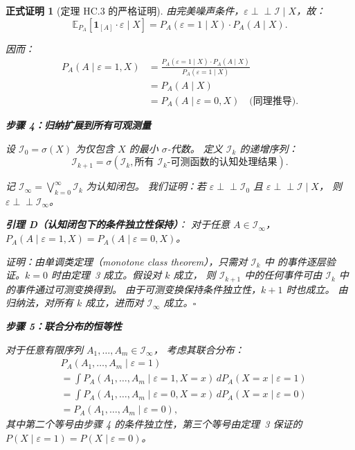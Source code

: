 \documentclass[12pt,a4paper]{article}
\newtheorem{formalproof}[theorem]{正式证明}
\newcommand{\E}{\mathbb{E}}
\newcommand{\cI}{\mathcal{I}}
\newcommand{\ind}[1]{\mathbf{1}_{[#1]}}
\begin{document}
\begin{formalproof}[定理 HC.3 的严格证明]
由完美噪声条件，$\varepsilon \perp\!\!\!\perp \cI \mid X$，故：
\begin{equation}
    \E_{P_A}[\ind{A} \cdot \varepsilon \mid X] = P_A(\varepsilon=1 \mid X) \cdot P_A(A \mid X).
\end{equation}

因而：
\begin{align}
    P_A(A \mid \varepsilon=1, X)
    &= \frac{P_A(\varepsilon=1 \mid X) \cdot P_A(A \mid X)}{P_A(\varepsilon=1 \mid X)} \\
    &= P_A(A \mid X) \\
    &= P_A(A \mid \varepsilon=0, X) \quad \text{(同理推导)}.
\end{align}

\textbf{步骤 4：归纳扩展到所有可观测量}

设 $\cI_0 = \sigma(X)$ 为仅包含 $X$ 的最小 $\sigma$-代数。
定义 $\cI_k$ 的递增序列：
\begin{equation}
    \cI_{k+1} = \sigma(\cI_k, \text{所有 $\cI_k$-可测函数的认知处理结果}).
\end{equation}

记 $\cI_{\infty} = \bigvee_{k=0}^{\infty} \cI_k$ 为认知闭包。
我们证明：若 $\varepsilon \perp\!\!\!\perp \cI_0$ 且 $\varepsilon \perp\!\!\!\perp \cI \mid X$，
则 $\varepsilon \perp\!\!\!\perp \cI_{\infty}$。

\textbf{引理 D（认知闭包下的条件独立性保持）}：
对于任意 $A \in \cI_{\infty}$，$P_A(A \mid \varepsilon=1, X) = P_A(A \mid \varepsilon=0, X)$。

\textit{证明}：由单调类定理（monotone class theorem），只需对 $\cI_k$ 中
的事件逐层验证。$k=0$ 时由定理~3 成立。假设对 $k$ 成立，
则 $\cI_{k+1}$ 中的任何事件可由 $\cI_k$ 中的事件通过可测变换得到。
由于可测变换保持条件独立性，$k+1$ 时也成立。
由归纳法，对所有 $k$ 成立，进而对 $\cI_{\infty}$ 成立。$\square$

\textbf{步骤 5：联合分布的恒等性}

对于任意有限序列 $A_1, \dots, A_m \in \cI_{\infty}$，
考虑其联合分布：
\begin{align}
    &P_A(A_1, \dots, A_m \mid \varepsilon=1) \\
    &= \int P_A(A_1, \dots, A_m \mid \varepsilon=1, X=x) \, dP_A(X=x \mid \varepsilon=1) \\
    &= \int P_A(A_1, \dots, A_m \mid \varepsilon=0, X=x) \, dP_A(X=x \mid \varepsilon=0) \\
    &= P_A(A_1, \dots, A_m \mid \varepsilon=0),
\end{align}
其中第二个等号由步骤 4 的条件独立性，第三个等号由定理~3 保证的
$P(X \mid \varepsilon=1) = P(X \mid \varepsilon=0)$。


\end{formalproof}
\end{document}
